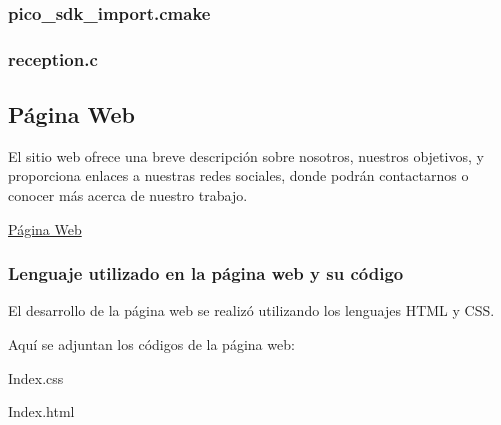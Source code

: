 \documentclass{article}
\begin{document}
\subsubsection{pico\_sdk\_import.cmake}

\subsubsection{reception.c}

\subsection{Página Web}
El sitio web ofrece una breve descripción sobre nosotros, nuestros objetivos, y proporciona enlaces a nuestras redes sociales, donde podrán contactarnos o conocer más acerca de nuestro trabajo.

\begin{center}
    \href{https://proyectobias.github.io/Bias/}{Página Web}
\end{center}

\subsubsection{Lenguaje utilizado en la página web y su código}
El desarrollo de la página web se realizó utilizando los lenguajes HTML y CSS.

Aquí se adjuntan los códigos de la página web:

\begin{center}
    Index.css
\end{center}



\begin{center}
    Index.html
\end{center}


\end{document}
